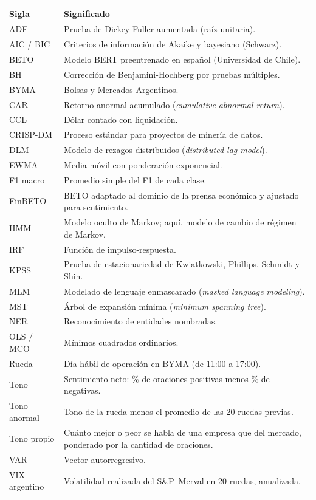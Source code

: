 \documentclass[11pt,a4paper,oneside]{report}
\begin{document}
\begin{longtable}{@{}L{2.6cm}L{11.3cm}@{}}
\toprule
\textbf{Sigla} & \textbf{Significado} \\
\midrule
\endhead
ADF & Prueba de Dickey-Fuller aumentada (raíz unitaria). \\
AIC / BIC & Criterios de información de Akaike y bayesiano (Schwarz). \\
BETO & Modelo BERT preentrenado en español (Universidad de Chile). \\
BH & Corrección de Benjamini-Hochberg por pruebas múltiples. \\
BYMA & Bolsas y Mercados Argentinos. \\
CAR & Retorno anormal acumulado (\textit{cumulative abnormal return}). \\
CCL & Dólar contado con liquidación. \\
CRISP-DM & Proceso estándar para proyectos de minería de datos. \\
DLM & Modelo de rezagos distribuidos (\textit{distributed lag model}). \\
EWMA & Media móvil con ponderación exponencial. \\
F1 macro & Promedio simple del F1 de cada clase. \\
FinBETO & BETO adaptado al dominio de la prensa económica y ajustado para sentimiento. \\
HMM & Modelo oculto de Markov; aquí, modelo de cambio de régimen de Markov. \\
IRF & Función de impulso-respuesta. \\
KPSS & Prueba de estacionariedad de Kwiatkowski, Phillips, Schmidt y Shin. \\
MLM & Modelado de lenguaje enmascarado (\textit{masked language modeling}). \\
MST & Árbol de expansión mínima (\textit{minimum spanning tree}). \\
NER & Reconocimiento de entidades nombradas. \\
OLS / MCO & Mínimos cuadrados ordinarios. \\
Rueda & Día hábil de operación en BYMA (de 11:00 a 17:00). \\
Tono & Sentimiento neto: \% de oraciones positivas menos \% de negativas. \\
Tono anormal & Tono de la rueda menos el promedio de las 20 ruedas previas. \\
Tono propio & Cuánto mejor o peor se habla de una empresa que del mercado, ponderado por la cantidad de oraciones. \\
VAR & Vector autorregresivo. \\
VIX argentino & Volatilidad realizada del S\&P~Merval en 20 ruedas, anualizada. \\
\bottomrule
\end{longtable}
\end{document}

